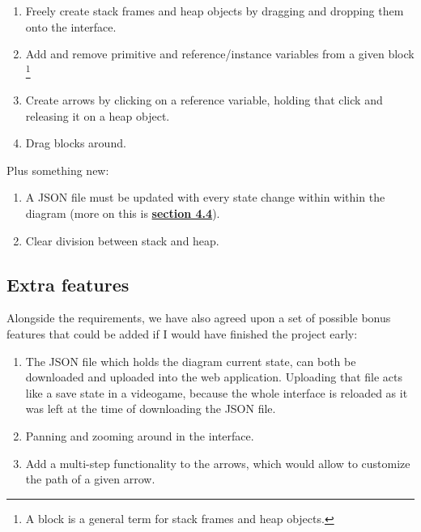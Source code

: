 \documentclass[]{usiinfbachelorproject}
\begin{document}
\begin{enumerate}
	\item Freely create stack frames and heap objects by dragging and dropping them onto the interface.
	\item Add and remove primitive and reference/instance variables from a given block \footnote{A block is a general term for stack frames and heap objects.}
	\item Create arrows by clicking on a reference variable, holding that click and releasing it on a heap object.
	\item Drag blocks around.
\end{enumerate}

\pagebreak
\vspace{\fill}

\noindent Plus something new:

\begin{enumerate}
	\item A JSON file must be updated with every state change within within the diagram (more on this is \hyperref[storing states]{\textbf{section 4.4}}).
	\item Clear division between stack and heap.
\end{enumerate}

\subsection{Extra features}

Alongside the requirements, we have also agreed upon a set of possible bonus features that could be added if I would have finished the project early:

\begin{enumerate}
	\item The JSON file which holds the diagram current state, can both be downloaded and uploaded into the web application. Uploading that file acts like a save state in a videogame, because the whole interface is reloaded as it was left at the time of downloading the JSON file.
	\item Panning and zooming around in the interface.
	\item Add a multi-step functionality to the arrows, which would allow to customize the path of a given arrow.
\end{enumerate}

\vspace{\fill}

\pagebreak
\end{document}
